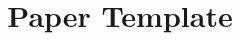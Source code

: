 \documentclass[acmsmall,review,screen,10pt]{acmart}\settopmatter{printfolios=true,printccs=false,printacmref=false}
\begin{document}
\title[Paper]{Paper Template}






\maketitle












\end{document}
